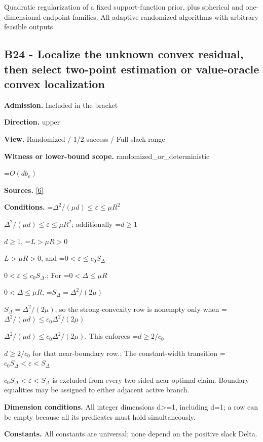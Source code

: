 \documentclass[10pt,a4paper]{article}
\newcommand{\AtlasMath}[1]{\par\begingroup\centering\setbox0=\hbox{$\displaystyle #1$}\ifdim\wd0>1.4\linewidth\typeout{ATLAS WIDE FORMULA: \the\wd0}\fi\ifdim\wd0>\linewidth\resizebox{\linewidth}{!}{\box0}\else\box0\fi\par\endgroup}
\newcommand{\AtlasInlineMath}[1]{\begingroup\setbox0=\hbox{$#1$}\ifdim\wd0>.4\linewidth\endgroup\AtlasMath{#1}\else\endgroup$#1$\fi}
\begin{document}
Quadratic regularization of a fixed support-function prior, plus spherical and one-dimensional endpoint families. All adaptive randomized algorithms with arbitrary feasible outputs



\subsection{B24 - Localize the unknown convex residual, then select two-point estimation or value-oracle convex localization}


\textbf{Admission.} Included in the bracket



\textbf{Direction.} upper



\textbf{View.} Randomized / 1/2 success / Full slack range



\textbf{Witness or lower-bound scope.} randomized\_or\_deterministic



\AtlasMath{O(db_\varepsilon)}


\textbf{Sources.} \href{https://github.com/WU-Wendao/Colombo/blob/main/colombo_sensorium/Complexity_altas/data/sources/colombo/U10/manuscript.pdf}{[6]}



\textbf{Conditions.} \AtlasInlineMath{\Delta^2/(\mu d)\le\varepsilon\le\mu R^2}; additionally \AtlasInlineMath{d\ge1}, \AtlasInlineMath{L>\mu R>0}, and \AtlasInlineMath{0<\varepsilon\le c_0S_\Delta}.; For \AtlasInlineMath{0<\Delta\le\mu R}, \AtlasInlineMath{S_\Delta=\Delta^2/(2\mu)}, so the strong-convexity row is nonempty only when \AtlasInlineMath{\Delta^2/(\mu d)\le c_0\Delta^2/(2\mu)}. This enforces \AtlasInlineMath{d\ge2/c_0} for that near-boundary row.; The constant-width transition \AtlasInlineMath{c_0S_\Delta<\varepsilon<S_\Delta} is excluded from every two-sided near-optimal claim. Boundary equalities may be assigned to either adjacent active branch.



\textbf{Dimension conditions.} All integer dimensions d>=1, including d=1; a row can be empty because all its predicates must hold simultaneously.



\textbf{Constants.} All constants are universal; none depend on the positive slack Delta.
\end{document}

